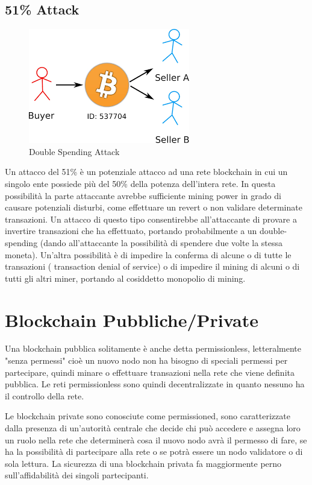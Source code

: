 \documentclass[11pt,a4paper,titlepage]{report}
\begin{document}
\subsection{51\% Attack}
\begin{figure}[h]
	\includegraphics[height=0.2\textheight]{dsa}
	\centering
	\caption{Double Spending Attack}
	\label{fig:ds-attack}
\end{figure}
Un attacco del 51\% è un potenziale attacco ad una rete blockchain in cui un singolo ente possiede più del 50\% della potenza dell'intera rete. In questa possibilità la parte attaccante avrebbe sufficiente mining power in grado di causare potenziali disturbi, come effettuare un revert o non validare determinate transazioni. Un attacco di questo tipo consentirebbe all’attaccante di provare a invertire transazioni che ha effettuato, portando probabilmente a un double-spending (dando all'attaccante la possibilità di spendere due volte la stessa moneta). Un'altra possibilità è di impedire la conferma di alcune o di tutte le transazioni ( transaction denial of service) o di impedire il mining di alcuni o di tutti gli altri miner, portando al cosiddetto monopolio di mining.

\section{Blockchain Pubbliche/Private}
Una blockchain pubblica solitamente è anche detta permissionless, letteralmente "senza permessi" cioè un nuovo nodo non ha bisogno di speciali permessi per partecipare, quindi minare o effettuare transazioni nella rete che viene definita pubblica. Le reti permissionless sono quindi decentralizzate in quanto nessuno ha il controllo della rete.

Le blockchain private sono conosciute come permissioned, sono caratterizzate dalla presenza di un’autorità centrale che decide chi può accedere e assegna loro un ruolo nella rete che determinerà cosa il nuovo nodo avrà il permesso di fare, se ha la possibilità di partecipare alla rete o se potrà essere un nodo validatore o di sola lettura. La sicurezza di una blockchain privata fa maggiormente perno sull'affidabilità dei singoli partecipanti.
\end{document}
